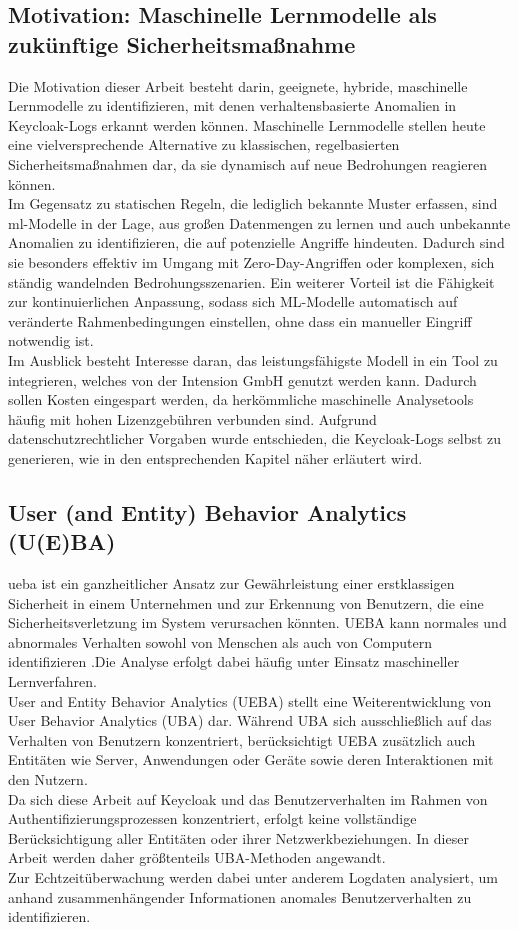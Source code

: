 \documentclass[a4paper,12pt]{article}
\begin{document}
	\subsection{Motivation: Maschinelle Lernmodelle als zukünftige Sicherheitsmaßnahme}
	Die Motivation dieser Arbeit besteht darin, geeignete, hybride, maschinelle Lernmodelle zu identifizieren, mit denen verhaltensbasierte Anomalien in Keycloak-Logs erkannt werden können. Maschinelle Lernmodelle stellen heute eine vielversprechende Alternative zu klassischen, regelbasierten Sicherheitsmaßnahmen dar, da sie dynamisch auf neue Bedrohungen reagieren können.
	\\[0.5em]
	Im Gegensatz zu statischen Regeln, die lediglich bekannte Muster erfassen, sind \gls{ml}-Modelle in der Lage, aus großen Datenmengen zu lernen und auch unbekannte Anomalien zu identifizieren, die auf potenzielle Angriffe hindeuten. Dadurch sind sie besonders effektiv im Umgang mit Zero-Day-Angriffen oder komplexen, sich ständig wandelnden Bedrohungsszenarien. Ein weiterer Vorteil ist die Fähigkeit zur kontinuierlichen Anpassung, sodass sich ML-Modelle automatisch auf veränderte Rahmenbedingungen einstellen, ohne dass ein manueller Eingriff notwendig ist.
	\\[0.5em]
	Im Ausblick besteht Interesse daran, das leistungsfähigste Modell in ein Tool zu integrieren, welches von der Intension GmbH genutzt werden kann. Dadurch sollen Kosten eingespart werden, da herkömmliche maschinelle Analysetools häufig mit hohen Lizenzgebühren verbunden sind. Aufgrund datenschutzrechtlicher Vorgaben wurde entschieden, die Keycloak-Logs selbst zu generieren, wie in den entsprechenden Kapitel näher erläutert wird.
	
	\subsection{User (and Entity) Behavior Analytics (U(E)BA)}
	\gls{ueba} ist ein ganzheitlicher Ansatz zur Gewährleistung einer erstklassigen Sicherheit in einem Unternehmen und zur Erkennung von Benutzern, die eine Sicherheitsverletzung im System verursachen könnten. UEBA kann normales und abnormales Verhalten sowohl von Menschen als auch von Computern identifizieren .Die Analyse erfolgt dabei häufig unter Einsatz maschineller Lernverfahren.
	\\[0.5em]
	User and Entity Behavior Analytics (UEBA) stellt eine Weiterentwicklung von User Behavior Analytics (UBA) dar. Während UBA sich ausschließlich auf das Verhalten von Benutzern konzentriert, berücksichtigt UEBA zusätzlich auch Entitäten wie Server, Anwendungen oder Geräte sowie deren Interaktionen mit den Nutzern.
	\\[0.5em]
	Da sich diese Arbeit auf Keycloak und das Benutzerverhalten im Rahmen von Authentifizierungsprozessen konzentriert, erfolgt keine vollständige Berücksichtigung aller Entitäten oder ihrer Netzwerkbeziehungen. In dieser Arbeit werden daher größtenteils UBA-Methoden angewandt.
	\\[0.5em]
	Zur Echtzeitüberwachung werden dabei unter anderem Logdaten analysiert, um anhand zusammenhängender Informationen anomales Benutzerverhalten zu identifizieren.
	
\end{document}
